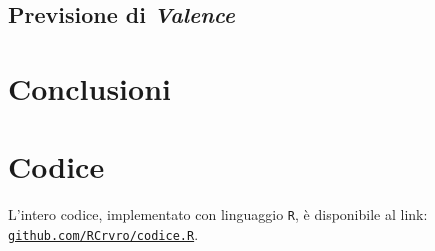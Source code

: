 \documentclass[fleqn,10pt]{SelfArx} %
\begin{document}
\subsection{Previsione di \textit{Valence}}
\section{Conclusioni}

\section*{Codice}
L'intero codice, implementato con linguaggio \texttt{R}, è disponibile al link: \href{https://github.com/RCrvro/Foundation-of-Prob.-and-Stat.---Final-Project/blob/master/codice.R}{\texttt{github.com/RCrvro/codice.R}}.
\end{document}
